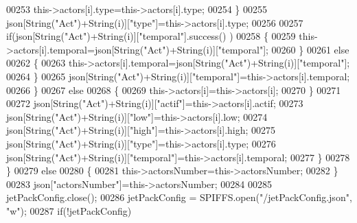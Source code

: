 \begin{DoxyCode}
00253                             this->actors[i].type=this->actors[i].type;
00254                         \}
00255                         json[String(\textcolor{stringliteral}{"Act"})+String(i)][\textcolor{stringliteral}{"type"}]=this->actors[i].type;
00256 
00257                         \textcolor{keywordflow}{if}(json[String(\textcolor{stringliteral}{"Act"})+String(i)][\textcolor{stringliteral}{"temporal"}].success() )
00258                         \{
00259                             this->actors[i].temporal=json[String(\textcolor{stringliteral}{"Act"})+String(i)][\textcolor{stringliteral}{"temporal"}];                                                     
00260                         \}
00261                         \textcolor{keywordflow}{else}
00262                         \{
00263                             this->actors[i].temporal=json[String(\textcolor{stringliteral}{"Act"})+String(i)][\textcolor{stringliteral}{"temporal"}]; 
00264                         \}   
00265                         json[String(\textcolor{stringliteral}{"Act"})+String(i)][\textcolor{stringliteral}{"temporal"}]=this->actors[i].temporal; 
00266                     \}
00267                     \textcolor{keywordflow}{else}
00268                     \{
00269                         this->actors[i]=this->actors[i];
00270                     \}
00271                     
00272                     json[String(\textcolor{stringliteral}{"Act"})+String(i)][\textcolor{stringliteral}{"actif"}]=this->actors[i].actif;
00273                     json[String(\textcolor{stringliteral}{"Act"})+String(i)][\textcolor{stringliteral}{"low"}]=this->actors[i].low;
00274                     json[String(\textcolor{stringliteral}{"Act"})+String(i)][\textcolor{stringliteral}{"high"}]=this->actors[i].high;
00275                     json[String(\textcolor{stringliteral}{"Act"})+String(i)][\textcolor{stringliteral}{"type"}]=this->actors[i].type;
00276                     json[String(\textcolor{stringliteral}{"Act"})+String(i)][\textcolor{stringliteral}{"temporal"}]=this->actors[i].temporal; 
00277                 \}
00278             \}
00279             \textcolor{keywordflow}{else}
00280             \{
00281                 this->actorsNumber=this->actorsNumber;
00282             \}
00283             json[\textcolor{stringliteral}{"actorsNumber"}]=this->actorsNumber;
00284 
00285             jetPackConfig.close();          
00286             jetPackConfig = SPIFFS.open(\textcolor{stringliteral}{"/jetPackConfig.json"}, \textcolor{stringliteral}{"w"});            
00287             \textcolor{keywordflow}{if}(!jetPackConfig)

\end{DoxyCode}
